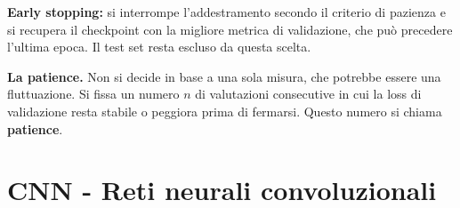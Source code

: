 \documentclass[11pt,a4paper,oneside,openany]{book}
\begin{document}
\textbf{Early stopping:} si interrompe l'addestramento secondo il criterio di pazienza e si recupera il checkpoint con la migliore metrica di validazione, che può precedere l'ultima epoca. Il test set resta escluso da questa scelta.

\textbf{La patience.} Non si decide in base a una sola misura, che potrebbe essere una fluttuazione. Si fissa un numero \(n\) di valutazioni consecutive in cui la loss di validazione resta stabile o peggiora prima di fermarsi. Questo numero si chiama \textbf{patience}.


\chapter{CNN - Reti neurali convoluzionali}\label{fonte02}
\end{document}
